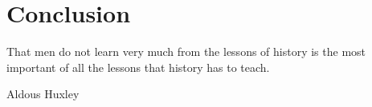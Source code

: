 
\section{Conclusion}
\label{ch:conclusion}

\epigraph{That men do not learn very much from the lessons of history is the most important of all the lessons that history has to teach.}{Aldous Huxley}

\cleardoublepage